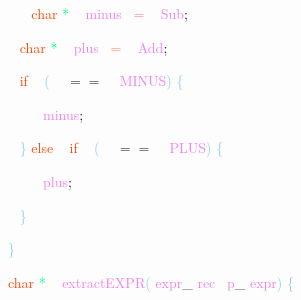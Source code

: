 \documentclass[8, usernames, dvipsnames]{beamer}
\begin{document}
\begin{frame}
\textcolor{White}{\   }
\textcolor{White}{\   }
\textcolor{OrangeRed}{char}
\textcolor{SpringGreen}{*}
\textcolor{White}{\ }
\textcolor{Violet}{minus}\textcolor{White}{\ }
\textcolor{Salmon}{=}
\textcolor{White}{\ }
\textcolor{Violet}{Sub}\textcolor{Sepia}{;}

 \textcolor{White}{\   }
\textcolor{OrangeRed}{char}
\textcolor{SpringGreen}{*}
\textcolor{White}{\ }
\textcolor{Violet}{plus}\textcolor{White}{\ }
\textcolor{Salmon}{=}
\textcolor{White}{\ }
\textcolor{Violet}{Add}\textcolor{Sepia}{;}

 \textcolor{White}{\   }
\textcolor{OrangeRed}{if}
\textcolor{White}{\ }
\textcolor{SkyBlue}{(}
\textcolor{White}{\ }
\textcolor{OliveGreen}{$==$}
\textcolor{White}{\ }
\textcolor{Violet}{MINUS}\textcolor{SkyBlue}{)}
\textcolor{SkyBlue}{\{ }

 \textcolor{White}{\   }
\textcolor{White}{\   }
\textcolor{OrangeRed}{	}
\textcolor{White}{\ }
\textcolor{Violet}{minus}\textcolor{Sepia}{;}

 \textcolor{White}{\   }
\textcolor{SkyBlue}{\} }
\textcolor{OrangeRed}{else}
\textcolor{White}{\ }
\textcolor{OrangeRed}{if}
\textcolor{White}{\ }
\textcolor{SkyBlue}{(}
\textcolor{White}{\ }
\textcolor{OliveGreen}{$==$}
\textcolor{White}{\ }
\textcolor{Violet}{PLUS}\textcolor{SkyBlue}{)}
\textcolor{SkyBlue}{\{ }

 \textcolor{White}{\   }
\textcolor{White}{\   }
\textcolor{OrangeRed}{	}
\textcolor{White}{\ }
\textcolor{Violet}{plus}\textcolor{Sepia}{;}

 \textcolor{White}{\   }
\textcolor{SkyBlue}{\} }

 \textcolor{SkyBlue}{\} }

 
 \textcolor{OrangeRed}{char}
\textcolor{SpringGreen}{*}
\textcolor{White}{\ }
\textcolor{Violet}{extractEXPR}\textcolor{SkyBlue}{(}
\textcolor{Violet}{expr}\textcolor{Sepia}{\_}
\textcolor{Violet}{rec}\textcolor{White}{\ }
\textcolor{Violet}{p}\textcolor{Sepia}{\_}
\textcolor{Violet}{expr}\textcolor{SkyBlue}{)}
\textcolor{SkyBlue}{\{ }

 \end{frame}
\end{document}
